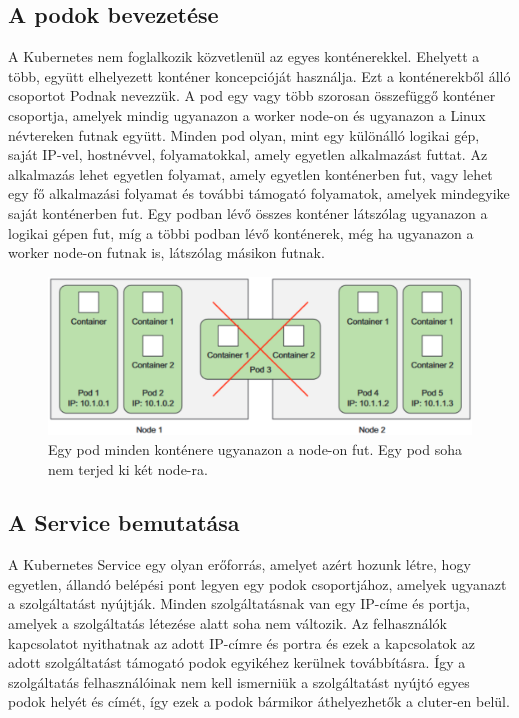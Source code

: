\subsection{A podok bevezetése}
A Kubernetes nem foglalkozik közvetlenül az egyes konténerekkel. Ehelyett a több, együtt elhelyezett konténer koncepcióját használja. Ezt a konténerekből álló csoportot Podnak nevezzük. A pod egy vagy több szorosan összefüggő konténer csoportja, amelyek mindig ugyanazon a worker node-on és ugyanazon a Linux névtereken futnak együtt. Minden pod olyan, mint egy különálló logikai gép, saját IP-vel, hostnévvel, folyamatokkal, amely egyetlen alkalmazást futtat. Az alkalmazás lehet egyetlen folyamat, amely egyetlen konténerben fut, vagy lehet egy fő alkalmazási folyamat és további támogató folyamatok, amelyek mindegyike saját konténerben fut. Egy podban lévő összes konténer látszólag ugyanazon a logikai gépen fut, míg a többi podban lévő konténerek, még ha ugyanazon a worker node-on futnak is, látszólag másikon futnak.
\cite{Marko17}

\begin{figure}[ht]
    \centering
         \includegraphics[width=1.0\textwidth]{figures/kubernetes/node-pod-scheduler.png}
          \caption{Egy pod minden konténere ugyanazon a node-on fut. Egy pod soha nem terjed ki két node-ra. \cite{Marko17}}
           \label{node-pod-scheduler}
\end{figure}

\subsection{A Service bemutatása}
A Kubernetes Service egy olyan erőforrás, amelyet azért hozunk létre, hogy egyetlen, állandó
belépési pont legyen egy podok csoportjához, amelyek ugyanazt a szolgáltatást nyújtják. Minden szolgáltatásnak van egy IP-címe és portja, amelyek a szolgáltatás létezése alatt soha nem változik. Az felhasználók kapcsolatot nyithatnak az adott IP-címre és portra és ezek a kapcsolatok az adott szolgáltatást támogató podok egyikéhez kerülnek továbbításra. Így a szolgáltatás felhasználóinak nem kell ismerniük a szolgáltatást nyújtó egyes podok helyét és címét, így ezek a podok bármikor áthelyezhetők a cluter-en belül.
\cite{Marko17}

